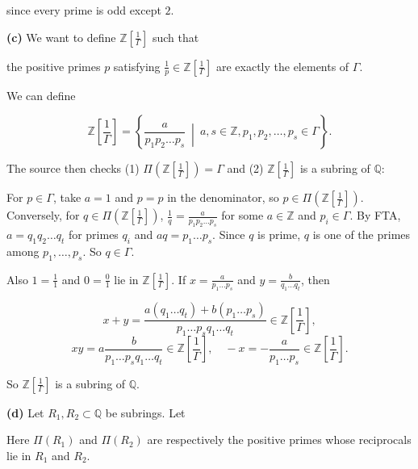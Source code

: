 since every prime is odd except \(2\).

\textbf{(c)} We want to define \(\mathbb{Z}\left\lbrack \frac{1}{\Gamma} \right\rbrack\) such that

the positive primes \(p\) satisfying \(\frac{1}{p} \in \mathbb{Z}\left\lbrack \frac{1}{\Gamma} \right\rbrack\) are exactly the elements of \(\Gamma\).

We can define

\[\mathbb{Z}\left\lbrack \frac{1}{\Gamma} \right\rbrack = \left\{ \frac{a}{p_{1}p_{2}\ldots p_{s}}\  \middle| \ a,s \in \mathbb{Z},p_{1},p_{2},\ldots,p_{s} \in \Gamma \right\}.\]

The source then checks (1) \(\Pi\left( {\mathbb{Z}\left\lbrack \frac{1}{\Gamma} \right\rbrack} \right) = \Gamma\) and (2) \(\mathbb{Z}\left\lbrack \frac{1}{\Gamma} \right\rbrack\) is a subring of \(\mathbb{Q}\):

For \(p \in \Gamma\), take \(a = 1\) and \(p = p\) in the denominator, so \(p \in \Pi\left( {\mathbb{Z}\left\lbrack \frac{1}{\Gamma} \right\rbrack} \right)\). Conversely, for \(q \in \Pi\left( {\mathbb{Z}\left\lbrack \frac{1}{\Gamma} \right\rbrack} \right)\), \(\frac{1}{q} = \frac{a}{p_{1}p_{2}\ldots p_{s}}\) for some \(a \in \mathbb{Z}\) and \(p_{i} \in \Gamma\). By FTA, \(a = q_{1}q_{2}\ldots q_{t}\) for primes \(q_{i}\) and \(aq = p_{1}\ldots p_{s}\). Since \(q\) is prime, \(q\) is one of the primes among \(p_{1},\ldots,p_{s}\). So \(q \in \Gamma\).

Also \(1 = \frac{1}{1}\) and \(0 = \frac{0}{1}\) lie in \(\mathbb{Z}\left\lbrack \frac{1}{\Gamma} \right\rbrack\). If \(x = \frac{a}{p_{1}\ldots p_{s}}\) and \(y = \frac{b}{q_{1}\ldots q_{t}}\), then

\[x + y = \frac{a\left( {q_{1}\ldots q_{t}} \right) + b\left( {p_{1}\ldots p_{s}} \right)}{p_{1}\ldots p_{s}q_{1}\ldots q_{t}} \in \mathbb{Z}\left\lbrack \frac{1}{\Gamma} \right\rbrack,\]\[xy = a\frac{b}{p_{1}\ldots p_{s}q_{1}\ldots q_{t}} \in \mathbb{Z}\left\lbrack \frac{1}{\Gamma} \right\rbrack,\quad - x = - \frac{a}{p_{1}\ldots p_{s}} \in \mathbb{Z}\left\lbrack \frac{1}{\Gamma} \right\rbrack.\]

So \(\mathbb{Z}\left\lbrack \frac{1}{\Gamma} \right\rbrack\) is a subring of \(\mathbb{Q}\).

\textbf{(d)} Let \(R_{1},R_{2} \subset \mathbb{Q}\) be subrings. Let

Here \(\Pi\left( R_{1} \right)\) and \(\Pi\left( R_{2} \right)\) are respectively the positive primes whose reciprocals lie in \(R_{1}\) and \(R_{2}\).

